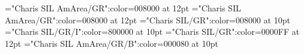 \documentclass[a4paper,twoside]{article}
\begin{document}
\font\variantentrytypevariantentrytypesvariantformentrybackrefbvariantformentrybackrefsbentryletDatadicBody="Charis SIL AmArea/GR":color=008000 at 12pt
\font\abbreviationvariantentrytypevariantentrytypesvariantformentrybackrefbvariantformentrybackrefsbentryletDatadicBody="Charis SIL AmArea/GR":color=008000 at 12pt
\font\spanesabbreviationvariantentrytypevariantentrytypesvariantformentrybackrefbvariantformentrybackrefsbentryletDatadicBody="Charis SIL/GR":color=008000 at 10pt
\font\spanabbreviationvariantentrytypevariantentrytypesvariantformentrybackrefbvariantformentrybackrefsbentryletDatadicBody="Charis SIL/GR/I":color=800000 at 10pt
\font\headwordvariantformentrybackrefbvariantformentrybackrefsbentryletDatadicBody="Charis SIL/GR":color=0000FF at 12pt
\font\spanmxbheadwordvariantformentrybackrefbvariantformentrybackrefsbentryletDatadicBody="Charis SIL AmArea/GR/B":color=000080 at 10pt
\end{document}
